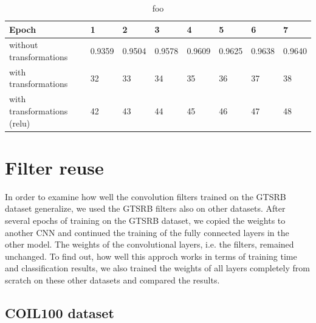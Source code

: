 \documentclass[11pt, a4paper]{article}
\begin{document}
\begin{table}[h!]
	\centering
	\begin{tabular}{|l|lllllll|}
		\hline
		Epoch & 1 & 2 & 3 & 4 & 5 & 6 & 7\\
		\hline
		without transformations & 0.9359 & 0.9504 & 0.9578 & 0.9609 & 0.9625 & 0.9638 & 0.9640\\
		with transformations & 32 & 33 & 34 & 35 & 36 & 37 & 38\\
		with transformations (relu) & 42 & 43 & 44 & 45 & 46 & 47 & 48\\
		\hline
	\end{tabular}
	\caption{foo}
	\label{tab:gtsrb-results}
\end{table}


\section{Filter reuse}

In order to examine how well the convolution filters trained on the GTSRB dataset generalize, we used the GTSRB filters also on other datasets. After several epochs of training on the GTSRB dataset, we copied the weights to another CNN and continued the training of the fully connected layers in the other model. The weights of the convolutional layers, i.e. the filters, remained unchanged. To find out, how well this approch works in terms of training time and classification results, we also trained the weights of all layers completely from scratch on these other datasets and compared the results.

\subsection{COIL100 dataset}
\end{document}

